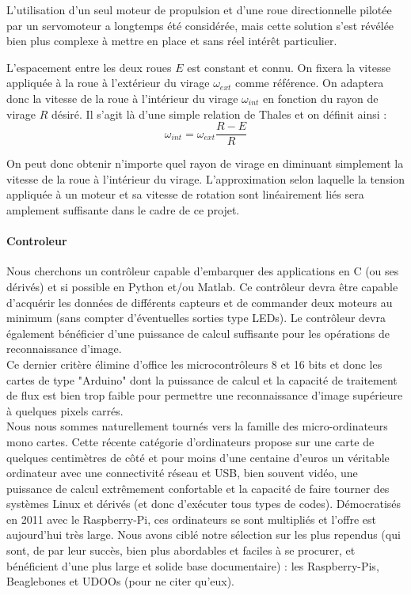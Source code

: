 			L'utilisation d'un seul moteur de propulsion et d'une roue directionnelle pilotée par un servomoteur a longtemps été considérée, mais cette solution s'est révélée bien plus complexe à mettre en place et sans réel intérêt particulier.\\


			L'espacement entre les deux roues $E$ est constant et connu.
			On fixera la vitesse appliquée à la roue à l'extérieur du virage $\omega_{ext}$ comme référence.
			On adaptera donc la vitesse de la roue à l'intérieur du virage $\omega_{int}$ en fonction du rayon de virage $R$ désiré.
			Il s'agit là d'une simple relation de Thales et on définit ainsi :
			\[\omega_{int} = \omega_{ext}\frac{R-E}{R}\]

			On peut donc obtenir n'importe quel rayon de virage en diminuant simplement la vitesse de la roue à l'intérieur du virage.
			L'approximation selon laquelle la tension appliquée à un moteur et sa vitesse de rotation sont linéairement liés sera amplement suffisante dans le cadre de ce projet.\\

		\paragraph{Controleur}\label{Solution-controleur}

			Nous cherchons un contrôleur capable d'embarquer des applications en C (ou ses dérivés) et si possible en Python et/ou Matlab.
			Ce contrôleur devra être capable d'acquérir les données de différents capteurs et de commander deux moteurs au minimum (sans compter d'éventuelles sorties type LEDs).
			Le contrôleur devra également bénéficier d'une puissance de calcul suffisante pour les opérations de reconnaissance d'image.\\

			Ce dernier critère élimine d'office les microcontrôleurs 8 et 16 bits et donc les cartes de type "Arduino" dont la puissance de calcul et la capacité de traitement de flux est bien trop faible pour permettre une reconnaissance d'image supérieure à quelques pixels carrés.\\

			Nous nous sommes naturellement tournés vers la famille des micro-ordinateurs mono cartes. Cette récente catégorie d'ordinateurs propose sur une carte de quelques centimètres de côté et pour moins d'une centaine d'euros un véritable ordinateur avec une connectivité réseau et USB, bien souvent vidéo, une puissance de calcul extrêmement confortable et la capacité de faire tourner des systèmes Linux et dérivés (et donc d’exécuter tous types de codes). Démocratisés en 2011 avec le Raspberry-Pi, ces ordinateurs se sont multipliés et l'offre est aujourd'hui très large. Nous avons ciblé notre sélection sur les plus rependus (qui sont, de par leur succès, bien plus abordables et faciles à se procurer, et bénéficient d'une plus large et solide base documentaire) : les Raspberry-Pis, Beaglebones et UDOOs (pour ne citer qu'eux).\\


